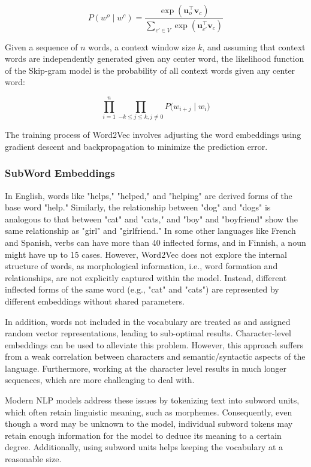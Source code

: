 \begin{equation}
    P(w^o \mid w^c) = \frac{\exp (\bm{u}_{o}^{\top}\bm{v}_{c})}{\sum_{c' \in V} \exp (\bm{u}_{c'}^{\top} \bm{v}_{c})}
\end{equation}

Given a sequence of $n$ words, a context window size $k$, and assuming that context words are independently generated given any center word, the likelihood function of the Skip-gram model is the probability of all context words given any center word:

\begin{equation}
    \prod_{i=1}^n \prod_{-k \leq j \leq k, j \neq 0} P\bigl(w_{i+j} \mid w_i \bigr)
\end{equation}


The training process of Word2Vec involves adjusting the word embeddings using gradient descent and backpropagation to minimize the prediction error. 
 
\subsubsection{SubWord Embeddings}

In English, words like "helps," "helped," and "helping" are derived forms of the base word "help." Similarly, the relationship between "dog" and "dogs" is analogous to that between "cat" and "cats," and "boy" and "boyfriend" show the same relationship as "girl" and "girlfriend." In some other languages like French and Spanish, verbs can have more than 40 inflected forms, and in Finnish, a noun might have up to 15 cases. However, Word2Vec does not explore the internal structure of words, as morphological information, i.e., word formation and relationships, are not explicitly captured within the model. Instead, different inflected forms of the same word (e.g., "cat" and "cats") are represented by different embeddings without shared parameters. 

In addition, words not included in the vocabulary are treated as  and assigned random vector representations, leading to sub-optimal results. Character-level embeddings \citep{wehrmann2017character} can be used to alleviate this problem. However, this approach suffers from a weak correlation between characters and semantic/syntactic aspects of the language. Furthermore, working at the character level results in much longer sequences, which are more challenging to deal with.

Modern NLP models address these issues by tokenizing text into subword units, which often retain linguistic meaning, such as morphemes. Consequently, even though a word may be unknown to the model, individual subword tokens may retain enough information for the model to deduce its meaning to a certain degree. Additionally, using subword units helps keeping the vocabulary at a reasonable size.


